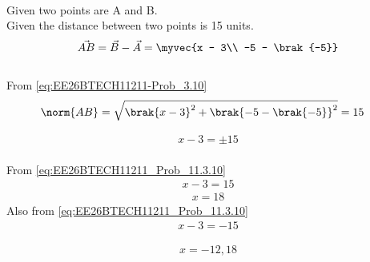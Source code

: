 \begin{enumerate}[label=\thesubsection.\arabic*, ref=\thesubsection.\theenumi]
\solution
\\ Given two points are A and B.
\\ Given the distance between two points is 15 units.
\begin{align}
\vec{AB} = \vec{B} - \vec{A} = \myvec{x - 3\\ -5 - \brak{-5}}
\end{align}
\\From \eqref{eq:EE26BTECH11211-Prob_3.10}
\begin{align}
\norm{AB} = \sqrt{\brak{x - 3}^2 + \brak{-5 -\brak{-5}}^2}&=15
\end{align}

\begin{align}
x - 3 = \pm15 \label{eq:EE26BTECH11211_Prob_11.3.10}
\end{align} 
\\From \eqref{eq:EE26BTECH11211_Prob_11.3.10}
\begin{align}
 x - 3 = 15
\end{align}
\begin{align}
x = 18
\end{align}
Also from \eqref{eq:EE26BTECH11211_Prob_11.3.10}
\begin{align} 
x-3 = -15
\end{align}

\begin{align}
x = -12, 18
\end{align}


\end{enumerate}
